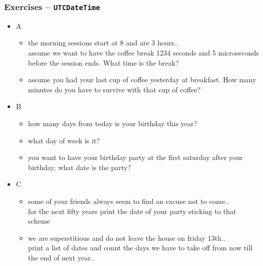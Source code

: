 \documentclass[t,10pt,compress=false,usepdftitle=false]{beamer}
\begin{document}
\begin{frame}[fragile]
    \frametitle{Exercises -- \tt{UTCDateTime}}
    \begin{itemize}
    \item A
        \begin{itemize}
        \item the morning sessions start at 8 and are 3 hours..\\ assume we
              want to have the coffee break 1234 seconds and 5 microseconds before
              the session ends. What time is the break?
        \item assume you had your last cup of coffee yesterday at breakfast. How many
              minutes do you have to survive with that cup of coffee?
        \end{itemize}
    \end{itemize}
    \begin{itemize}
    \item<2> B
        \begin{itemize}
        \item<2> how many days from today is your birthday this year?
        \item<2> what day of week is it?
        \item<2> you want to have your birthday party at the first saturday after your
              birthday, what date is the party?
        \end{itemize}
    \end{itemize}
    \begin{itemize}
    \item<2> C
        \begin{itemize}
        \item<2> some of your friends always seem to find an excuse not to come..\\
              for the next fifty years print the date of your party sticking to
              that scheme
        \item<2> we are superstitious and do not leave the house on friday 13th..\\
              print a list of dates and count the days we have to take off from
              now till the end of next year..
        \end{itemize}
    \end{itemize}
\end{frame}
\end{document}
